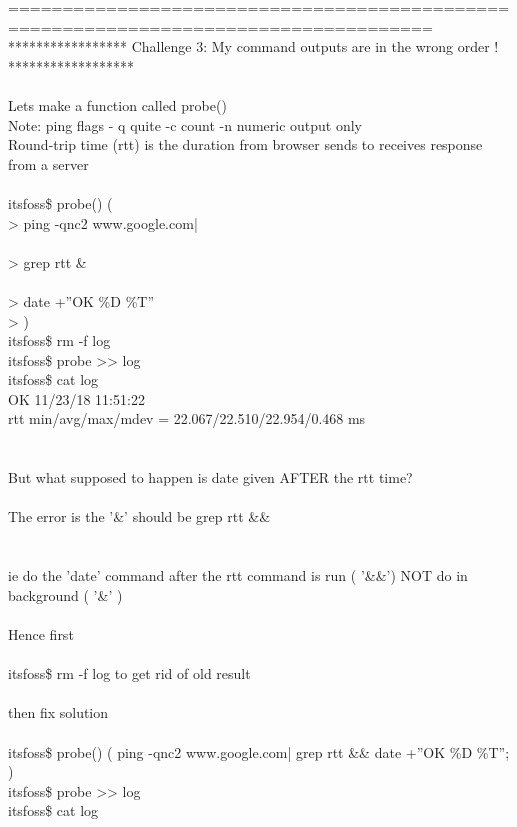 \documentclass[10pt,a4paper]{article}
\begin{document}
{=====================================================================================\\
*****************  Challenge 3: My command outputs are in the wrong order ! ******************  \\
\\
Lets make a function called probe()\\
Note: 	ping flags  - q  quite  -c count  -n  numeric output only\\
		Round-trip time (rtt) is the duration from browser sends to receives response from a server\\
\\
itsfoss\$ probe() (\\
> ping -qnc2 www.google.com}{\large  | \\\\
>  grep rtt \& \\\\
>  date +''OK \%D \%T''\\
> )\\
itsfoss\$ rm -f log\\
itsfoss\$ probe >> log\\
itsfoss\$ cat log\\
OK 11/23/18 11:51:22\\
rtt min/avg/max/mdev = 22.067/22.510/22.954/0.468 ms\\
\\
\\
But what supposed to happen is date given AFTER the rtt time?\\
\\
The error is the '\&'      should be    grep rtt \&\& \\\\
\\
ie do the 'date' command after the rtt command is run ( '\&\&') NOT do in background ( '\&' )\\
\\
Hence first\\
\\
itsfoss\$ rm -f log      to get rid of old result\\
\\
then fix solution\\
\\
itsfoss\$ probe() ( ping -qnc2 www.google.com}{\large  |  grep rtt \&\&  date +''OK \%D \%T''; )\\
itsfoss\$ probe >> log\\
itsfoss\$ cat log\\
}
\end{document}
